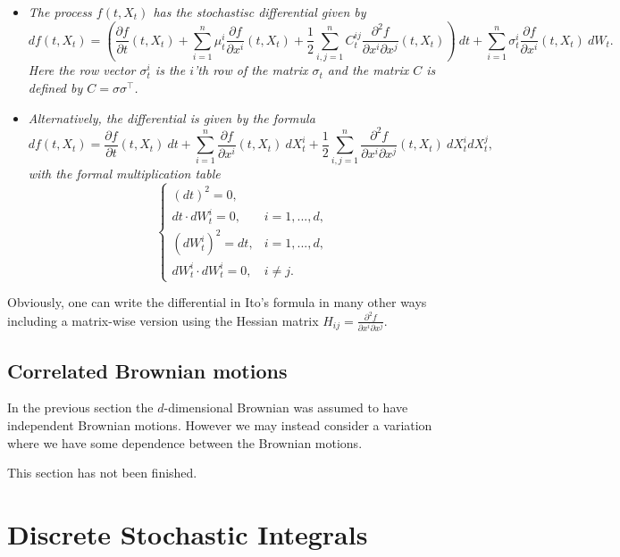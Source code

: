 \documentclass[
]{book}
\providecommand{\tightlist}{%
  \setlength{\itemsep}{0pt}\setlength{\parskip}{0pt}}
\begin{document}
\begin{itemize}
\tightlist
\item
  \emph{The process \(f(t,X_t)\) has the stochastisc differential given by}
  \[
    df(t,X_t)=\left(\frac{\partial f}{\partial t}(t,X_t) + \sum_{i=1}^n\mu^i_t\frac{\partial f}{\partial x^i}(t,X_t) + \frac{1}{2}\sum_{i,j=1}^nC_t^{ij}\frac{\partial^2 f}{\partial x^i\partial x^j}(t,X_t)\right)\ dt+\sum_{i=1}^n\sigma^i_t\frac{\partial f}{\partial x^i}(t,X_t)\ dW_t.
    \]
  \emph{Here the row vector \(\sigma^i_t\) is the \(i\)'th row of the matrix \(\sigma_t\) and the matrix \(C\) is defined by \(C=\sigma\sigma^\top\).}
\item
  \emph{Alternatively, the differential is given by the formula}
  \[
    df(t,X_t)=\frac{\partial f}{\partial t}(t,X_t)\ dt + \sum_{i=1}^n\frac{\partial f}{\partial x^i}(t,X_t)\ dX^i_t + \frac{1}{2}\sum_{i,j=1}^n\frac{\partial^2 f}{\partial x^i\partial x^j}(t,X_t)\ dX^i_tdX^j_t,
    \]
  \emph{with the formal multiplication table}
  \[
    \left\{\begin{matrix}(dt)^2=0,\\  dt\cdot dW_t^i=0, & i = 1,...,d,\\ (dW_t^i)^2=dt, & i=1,...,d, \\ dW_t^i\cdot dW_t^i =0, & i\ne j.\end{matrix}\right.
    \]
\end{itemize}

Obviously, one can write the differential in Ito's formula in many other ways including a matrix-wise version using the Hessian matrix \(H_{ij}=\frac{\partial^2 f}{\partial x^i\partial x^j}\).

\hypertarget{correlated-brownian-motions}{%
\subsection{Correlated Brownian motions}\label{correlated-brownian-motions}}

In the previous section the \(d\)-dimensional Brownian was assumed to have independent Brownian motions. However we may instead consider a variation where we have some dependence between the Brownian motions.

This section has not been finished.
\pagebreak

\hypertarget{discrete-stochastic-integrals}{%
\section{Discrete Stochastic Integrals}\label{discrete-stochastic-integrals}}
\end{document}
